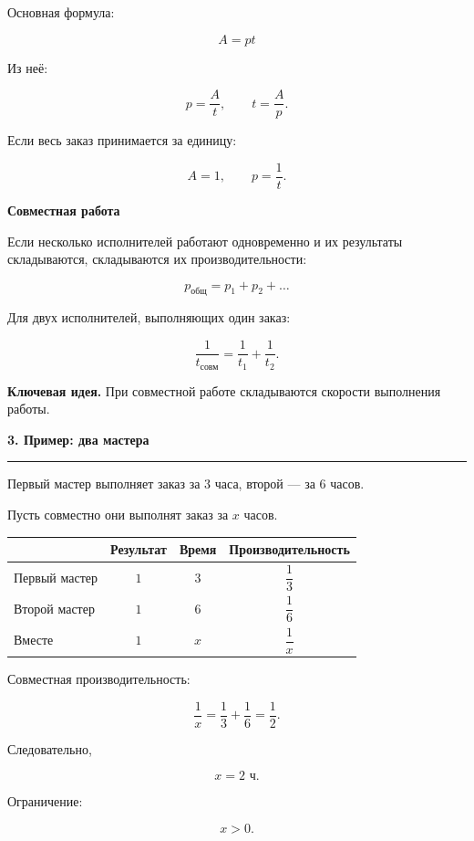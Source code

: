 \documentclass[a4paper,12pt]{article}
\newcommand{\topic}[1]{%
    \vspace{0.5em}
    {\Large\bfseries\color{darkaccent}#1}\par
    \vspace{0.25em}
    {\color{accent!55}\rule{\linewidth}{0.6pt}}\par
    \vspace{0.45em}
}
\newcommand{\subtopic}[1]{%
    \vspace{0.4em}
    {\large\bfseries\color{darkaccent}#1}\par
    \vspace{0.15em}
}
\newcommand{\keyidea}[1]{%
    \textbf{\color{darkaccent}Ключевая идея.} #1
}
\begin{document}
Основная формула:

\[
\boxed{A=pt}
\]

Из неё:

\[
\boxed{p=\frac{A}{t}},
\qquad
\boxed{t=\frac{A}{p}}.
\]

Если весь заказ принимается за единицу:

\[
A=1,
\qquad
p=\frac1t.
\]

\subtopic{Совместная работа}

Если несколько исполнителей работают одновременно и их результаты складываются, складываются их производительности:

\[
\boxed{p_{\text{общ}}=p_1+p_2+\ldots}
\]

Для двух исполнителей, выполняющих один заказ:

\[
\boxed{
\frac1{t_{\text{совм}}}
=
\frac1{t_1}+\frac1{t_2}
}.
\]

\keyidea{При совместной работе складываются скорости выполнения работы.}


\topic{3. Пример: два мастера}

Первый мастер выполняет заказ за $3$ часа, второй --- за $6$ часов.

Пусть совместно они выполнят заказ за $x$ часов.

\begin{center}
\renewcommand{\arraystretch}{1.35}
\begin{tabularx}{0.82\linewidth}{@{} X c c c @{}}
\toprule
& \textbf{Результат} & \textbf{Время} & \textbf{Производительность} \\
\midrule
Первый мастер & $1$ & $3$ & $\dfrac13$ \\
Второй мастер & $1$ & $6$ & $\dfrac16$ \\
Вместе & $1$ & $x$ & $\dfrac1x$ \\
\bottomrule
\end{tabularx}
\end{center}

Совместная производительность:

\[
\frac1x=\frac13+\frac16=\frac12.
\]

Следовательно,

\[
\boxed{x=2\text{ ч}}.
\]

Ограничение:

\[
x>0.
\]

\end{document}
